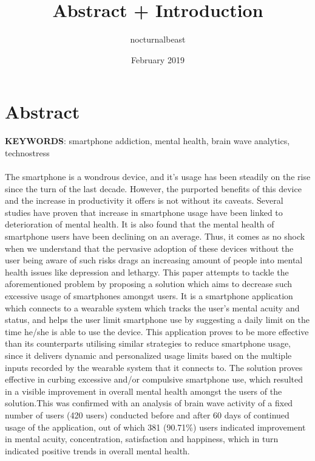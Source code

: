 \documentclass{article}
\title{Abstract + Introduction}
\author{nocturnalbeast}
\date{February 2019}
\begin{document}
\maketitle

\section{Abstract}

\textbf{KEYWORDS}: smartphone addiction, mental health, brain wave analytics, technostress

\paragraph{} The smartphone is a wondrous device, and it's usage has been steadily on the rise since the turn of the last decade. However, the purported benefits of this device and the increase in productivity it offers is not without its caveats. Several studies have proven that increase in smartphone usage have been linked to deterioration of mental health\cite{bian2015linking,twenge2017have,ward2017brain}. It is also found that the mental health of smartphone users have been declining on an average. Thus, it comes as no shock when we understand that the pervasive adoption of these devices without the user being aware of such risks drags an increasing amount of people into mental health issues like depression and lethargy. This paper attempts to tackle the aforementioned problem by proposing a solution which aims to decrease such excessive usage of smartphones amongst users. It is a smartphone application which connects to a wearable system which tracks the user's mental acuity and status, and helps the user limit smartphone use by suggesting a daily limit on the time he/she is able to use the device. This application proves to be more effective than its counterparts utilising similar strategies to reduce smartphone usage, since it delivers dynamic and personalized usage limits based on the multiple inputs recorded by the wearable system that it connects to. The solution proves effective in curbing excessive and/or compulsive smartphone use, which resulted in a visible improvement in overall mental health amongst the users of the solution.This was confirmed with an analysis of brain wave activity of a fixed number of users (420 users) conducted before and after 60 days of continued usage of the application, out of which 381 (90.71\%) users indicated improvement in mental acuity, concentration, satisfaction and happiness, which in turn indicated positive trends in overall mental health.
\end{document}
